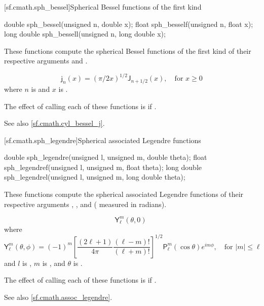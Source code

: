 [sf.cmath.sph_bessel]{Spherical Bessel functions of the first kind}%
%
%
%
%
%
\begin{itemdecl}
double       sph_bessel(unsigned n, double x);
float        sph_besself(unsigned n, float x);
long double  sph_bessell(unsigned n, long double x);
\end{itemdecl}

\begin{itemdescr}

\pnum\effects
These functions compute
the spherical Bessel functions of the first kind
of their respective arguments
 and .

\pnum\returns
\[%
  \mathsf{j}_n(x) =
  (\pi/2x)^{1\!/\!2} \mathsf{J}_{n + 1\!/\!2}(x),
	   \quad \mbox{for $x \ge 0$}
\]
where
$n$ is  and
$x$ is .

\pnum\remarks
The effect of calling each of these functions
is 
if .

\pnum See also \ref{sf.cmath.cyl_bessel_j}.
\end{itemdescr}

[sf.cmath.sph_legendre]{Spherical associated Legendre functions}%
%
%
%
%
%
%
\begin{itemdecl}
double       sph_legendre(unsigned l, unsigned m, double theta);
float        sph_legendref(unsigned l, unsigned m, float theta);
long double  sph_legendrel(unsigned l, unsigned m, long double theta);
\end{itemdecl}

\begin{itemdescr}
\pnum\effects
These functions compute the spherical associated Legendre functions
of their respective arguments
, , and  ( measured in radians).

\pnum\returns
\[%
  \mathsf{Y}_\ell^m(\theta, 0)
\;\]
where
\[%
  \mathsf{Y}_\ell^m(\theta, \phi) =
  (-1)^m \left[ \frac{(2 \ell + 1)}
                     {4 \pi}
	        \frac{(\ell - m)!}
	             {(\ell + m)!}
         \right]^{1/2}
	 \mathsf{P}_\ell^m
	 ( \cos\theta ) e ^ {i m \phi},
	   \quad \mbox{for $|m| \le \ell$}
\]
and
$l$ is ,
$m$ is , and
$\theta$ is .

\pnum\remarks
The effect of calling each of these functions
is 
if .

\pnum See also \ref{sf.cmath.assoc_legendre}.
\end{itemdescr}


